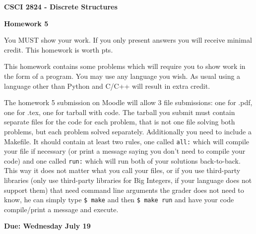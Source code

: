 \documentclass[addpoints]{exam}
\begin{document}
\singlespacing

\begin{center}
  {\large\textbf{CSCI 2824 - Discrete Structures}}

  {\large\textbf{Homework 5}}
\end{center}

You MUST show your work. If you only present answers you will receive minimal 
credit. This homework is worth \numpoints pts.

This homework contains some problems which will require you to show work in the
form of a program. You may use any language you wish. As usual using a language
other than Python and C/C++ will result in extra credit.

The homework 5 submission on Moodle will allow 3 file submissions: one for .pdf,
one for .tex, one for tarball with code. The tarball you submit must contain
separate files for the code for each problem, that is not one file solving both
problems, but each problem solved separately. Additionally you need to include a
Makefile. It should contain at least two rules, one called \texttt{all:} which
will compile your file if necessary (or print a message saying you don't need
to compile your code) and one called \texttt{run:} which will run both of your
solutions back-to-back. This way it does not matter what you call your files, or
if you use third-party libraries (only use third-party libraries for Big
Integers, if your language does not support them) that need command line
arguments the grader does not need to know, he can simply type \texttt{\$ make} 
and then \texttt{\$ make run} and have your code compile/print a message and
execute.

\textbf{Due: Wednesday July 19}
\end{document}
